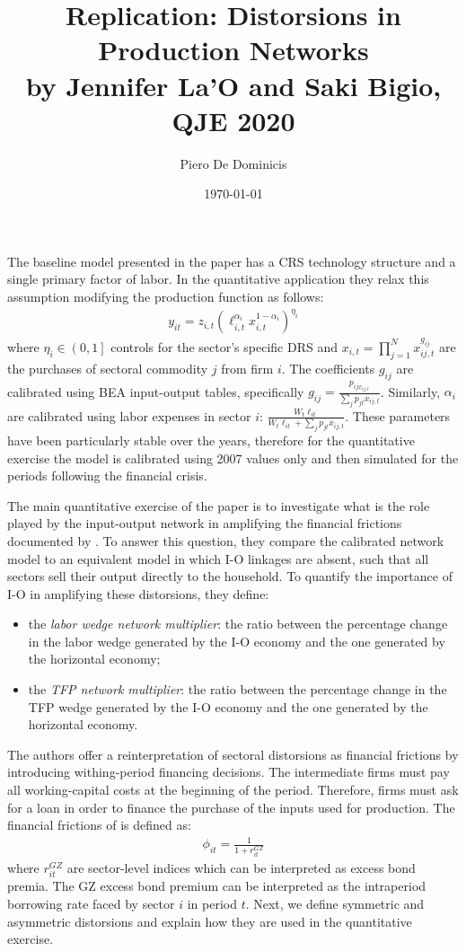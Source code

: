 \documentclass[english,letter,11pt,twoside]{article}
\title{\Large Replication: Distorsions in Production Networks \\
\large by Jennifer La'O and Saki Bigio, QJE 2020}
\author{Piero De Dominicis}
\date{\normalsize \today}
\begin{document}
\maketitle


The baseline model presented in the paper has a CRS technology structure and a single primary factor of labor. In the quantitative application they relax this assumption modifying the production function as follows:
\begin{align*}
	y_{it} = z_{i,t} \left( \ell_{i,t}^{\alpha_i} x_{i,t}^{1- \alpha_i} \right)^{\eta_i}
\end{align*}
where $\eta_i \in \left(0,1\right]$ controls for the sector's specific DRS and $x_{i,t} = \prod_{j = 1}^{N} x_{ij,t}^{g_{ij}}$ are the purchases of sectoral commodity $j$ from firm $i$. The coefficients $g_{ij}$ are calibrated using BEA input-output tables, specifically $g_{ij} = \frac{p_{ij x_{ij,t}}}{\sum_j p_{jt} x_{ij,t}}$. Similarly, $\alpha_i$ are calibrated using labor expenses in sector $i$: $\frac{W_t \ell_{it}}{W_t \ell_{it} + \sum_j p_{jt} x_{ij,t}}$. These parameters have been particularly stable over the years, therefore for the quantitative exercise the model is calibrated using 2007 values only and then simulated for the periods following the financial crisis.



The main quantitative exercise of the paper is to investigate what is the role played by the input-output network in amplifying the financial frictions documented by \cite{gilchrist2012credit}. To answer this question, they compare the calibrated network model to an equivalent model in which I-O linkages are absent, such that all sectors sell their output directly to the household. To quantify the importance of I-O in amplifying these distorsions, they define:
\begin{itemize}
	\item the \textit{labor wedge network multiplier}: the ratio between the percentage change in the labor wedge generated by the I-O economy and the one generated by the horizontal economy;
	\item the \textit{TFP network multiplier}: the ratio between the percentage change in the TFP wedge generated by the I-O economy and the one generated by the horizontal economy.
\end{itemize}

The authors offer a reinterpretation of sectoral distorsions as financial frictions by introducing withing-period financing decisions. The intermediate firms must pay all working-capital costs at the beginning of the period. Therefore, firms must ask for a loan in order to finance the purchase of the inputs used for production.
The financial frictions of \cite{gilchrist2012credit} is defined as:
\begin{align*}
\phi_{it} = \frac{1}{1 + r_{it}^{GZ}}
\end{align*}
where $r_{it}^{GZ}$ are sector-level indices which can be interpreted as excess bond premia. The GZ excess bond premium can be interpreted as the intraperiod borrowing rate faced by sector $i$ in period $t$. Next, we define symmetric and asymmetric distorsions and explain how they are used in the quantitative exercise.
\end{document}
